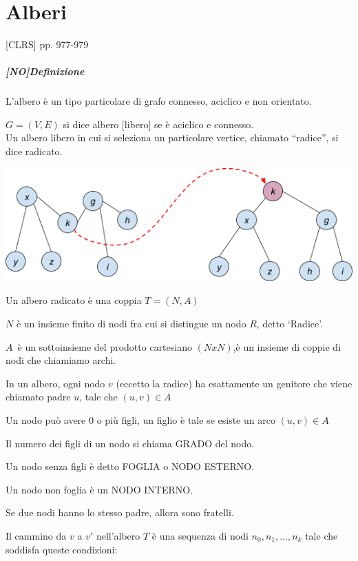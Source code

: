 \chapter{Alberi}

{{[}CLRS{]} pp. 977-979}

\paragraph{{[}NO{]}Definizione}

{L'albero è un tipo particolare di grafo connesso, aciclico e non orientato.}

$G=(V,E)$ si dice albero {[}libero{]} se è aciclico e connesso.\\
Un albero libero in cui si seleziona un particolare vertice, chiamato ``radice'', si dice radicato.

{\includegraphics{images/image533.png}}

{Un albero radicato è una coppia $T=(N,A)$}

{$N$ è un insieme finito di nodi fra cui si distingue un nodo $R$, detto `Radice'.}

$A${~è un sottoinsieme del prodotto cartesiano $(NxN)$,è un insieme di coppie di nodi che chiamiamo archi.}

{In un albero, ogni nodo $v$ (eccetto la radice) ha esattamente un genitore che viene chiamato padre $u$, tale che $(u,v) \in A$}



{Un nodo può avere $0$ o più figli, un figlio è tale se esiste un arco $(u,v) \in A$}

{Il numero dei figli di un nodo si chiama GRADO del nodo.}

{Un nodo senza figli è detto FOGLIA o NODO ESTERNO.}

{Un nodo non foglia è un NODO INTERNO.}

{Se due nodi hanno lo stesso padre, allora sono fratelli.}

{Il cammino da $v$ a $v'$ nell'albero $T$ è una sequenza di nodi $n_0,n_1,\ldots,n_k$ tale che soddisfa queste condizioni:}


